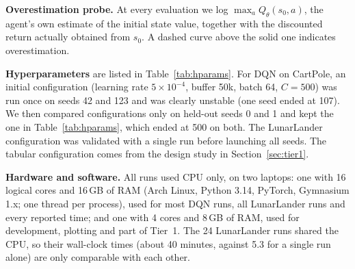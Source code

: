 \documentclass[10pt,twocolumn,letterpaper]{article}
\begin{document}
\textbf{Overestimation probe.} At every evaluation we log $\max_a Q_\theta(s_0,a)$, the agent's own estimate of the initial state value, together with the discounted return actually obtained from $s_0$. A dashed curve above the solid one indicates overestimation.

\textbf{Hyperparameters} are listed in Table~\ref{tab:hparams}. For DQN on CartPole, an initial configuration (learning rate $5\times10^{-4}$, buffer 50k, batch 64, $C=500$) was run once on seeds 42 and 123 and was clearly unstable (one seed ended at 107). We then compared configurations only on held-out seeds 0 and 1 and kept the one in Table~\ref{tab:hparams}, which ended at 500 on both. The LunarLander configuration was validated with a single run before launching all seeds. The tabular configuration comes from the design study in Section~\ref{sec:tier1}.

\textbf{Hardware and software.} All runs used CPU only, on two laptops: one with 16 logical cores and 16\,GB of RAM (Arch Linux, Python 3.14, PyTorch, Gymnasium 1.x; one thread per process), used for most DQN runs, all LunarLander runs and every reported time; and one with 4 cores and 8\,GB of RAM, used for development, plotting and part of Tier~1. The 24 LunarLander runs shared the CPU, so their wall-clock times (about 40 minutes, against 5.3 for a single run alone) are only comparable with each other.
\end{document}
